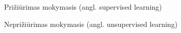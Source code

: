 Prižiūrimas mokymasis (angl. supervised learning) 

Neprižiūrimas mokymasis (angl. unsupervised learning)